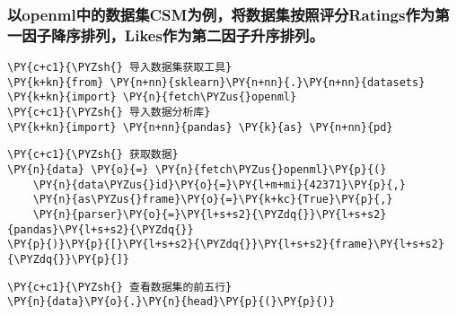     \hypertarget{ux4ee5openmlux4e2dux7684ux6570ux636eux96c6csmux4e3aux4f8bux5c06ux6570ux636eux96c6ux6309ux7167ux8bc4ux5206ratingsux4f5cux4e3aux7b2cux4e00ux56e0ux5b50ux964dux5e8fux6392ux5217likesux4f5cux4e3aux7b2cux4e8cux56e0ux5b50ux5347ux5e8fux6392ux5217}{%
\subsubsection{以openml中的数据集CSM为例，将数据集按照评分Ratings作为第一因子降序排列，Likes作为第二因子升序排列。}\label{ux4ee5openmlux4e2dux7684ux6570ux636eux96c6csmux4e3aux4f8bux5c06ux6570ux636eux96c6ux6309ux7167ux8bc4ux5206ratingsux4f5cux4e3aux7b2cux4e00ux56e0ux5b50ux964dux5e8fux6392ux5217likesux4f5cux4e3aux7b2cux4e8cux56e0ux5b50ux5347ux5e8fux6392ux5217}}

    \begin{tcolorbox}[breakable, size=fbox, boxrule=1pt, pad at break*=1mm,colback=cellbackground, colframe=cellborder]
\begin{Verbatim}[commandchars=\\\{\}]
\PY{c+c1}{\PYZsh{} 导入数据集获取工具}
\PY{k+kn}{from} \PY{n+nn}{sklearn}\PY{n+nn}{.}\PY{n+nn}{datasets} \PY{k+kn}{import} \PY{n}{fetch\PYZus{}openml}
\PY{c+c1}{\PYZsh{} 导入数据分析库}
\PY{k+kn}{import} \PY{n+nn}{pandas} \PY{k}{as} \PY{n+nn}{pd}
\end{Verbatim}
\end{tcolorbox}

    \begin{tcolorbox}[breakable, size=fbox, boxrule=1pt, pad at break*=1mm,colback=cellbackground, colframe=cellborder]
\begin{Verbatim}[commandchars=\\\{\}]
\PY{c+c1}{\PYZsh{} 获取数据}
\PY{n}{data} \PY{o}{=} \PY{n}{fetch\PYZus{}openml}\PY{p}{(}
    \PY{n}{data\PYZus{}id}\PY{o}{=}\PY{l+m+mi}{42371}\PY{p}{,}
    \PY{n}{as\PYZus{}frame}\PY{o}{=}\PY{k+kc}{True}\PY{p}{,}
    \PY{n}{parser}\PY{o}{=}\PY{l+s+s2}{\PYZdq{}}\PY{l+s+s2}{pandas}\PY{l+s+s2}{\PYZdq{}}
\PY{p}{)}\PY{p}{[}\PY{l+s+s2}{\PYZdq{}}\PY{l+s+s2}{frame}\PY{l+s+s2}{\PYZdq{}}\PY{p}{]}
\end{Verbatim}
\end{tcolorbox}

    \begin{tcolorbox}[breakable, size=fbox, boxrule=1pt, pad at break*=1mm,colback=cellbackground, colframe=cellborder]
\begin{Verbatim}[commandchars=\\\{\}]
\PY{c+c1}{\PYZsh{} 查看数据集的前五行}
\PY{n}{data}\PY{o}{.}\PY{n}{head}\PY{p}{(}\PY{p}{)}
\end{Verbatim}
\end{tcolorbox}

